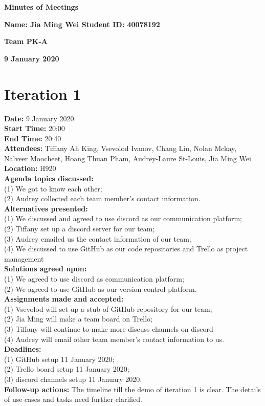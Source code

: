 \documentclass[12pt]{article}
\begin{document}
\vspace*{0.2in}
\centerline{\bf\Large Minutes of Meetings}

\vspace*{0.2in}
\centerline{\bf\Large Name: Jia Ming Wei   Student ID: 40078192}

\vspace*{0.2in}
\centerline{\bf\Large Team PK-A}

\vspace*{0.2in}
\centerline{\bf\Large 9 January 2020}

\newpage

\section{Iteration 1}

{\bf Date:} 9 January 2020\\
{\bf Start Time:} 20:00\\
{\bf End Time:}  20:40\\
{\bf Attendees:} Tiffany Ah King,
Vsevolod Ivanov,
Chang Liu,
Nolan Mckay,
Nalveer Moocheet,
Hoang Thuan Pham,
Audrey-Laure St-Louis,
Jia Ming Wei\\
{\bf Location:} H920 \\
{\bf Agenda topics discussed:} \\(1) We got to know each other; \\(2) Audrey collected each team member's contact information. \\
{\bf Alternatives presented:} \\(1) We discussed and agreed to use discord as our communication platform; \\(2) Tiffany set up a discord server for our team; \\(3) Audrey emailed us the contact information of our team; \\(4) We discussed to use GitHub as our code repositories and Trello as project management\\
{\bf Solutions agreed upon:} \\(1) We agreed to use discord as communication platform; \\(2) We agreed to use GitHub as our version control platform. \\
{\bf Assignments made and accepted:} \\(1) Vsevolod will set up a stub of GitHub repository for our team; \\(2) Jia Ming will make a team board on Trello; \\(3) Tiffany will continue to make more discuss channels on discord \\(4) Audrey will email other team member's contact information to us.\\
{\bf Deadlines:} \\(1) GitHub setup 11 January 2020; \\(2) Trello board setup 11 January 2020; \\(3) discord channels setup 11 January 2020. \\
{\bf Follow-up actions:} The timeline till the demo of iteration 1 is clear. The details of use cases and tasks need further clarified.\\
\end{document}
